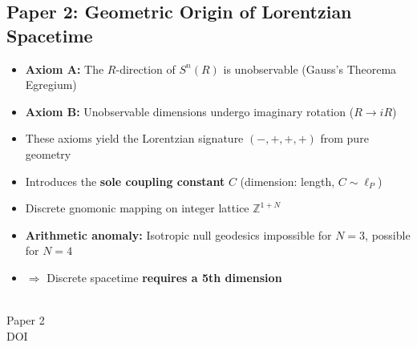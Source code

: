 \documentclass[11pt,a4paper]{article}
\begin{document}
\vspace{10pt}

\noindent\begin{minipage}[t]{0.82\textwidth}
\subsection*{Paper 2: Geometric Origin of Lorentzian Spacetime}
\vspace{-6pt}
\begin{itemize}
\item \textbf{Axiom A:} The $R$-direction of $S^n(R)$ is unobservable (Gauss's Theorema Egregium)
\item \textbf{Axiom B:} Unobservable dimensions undergo imaginary rotation ($R \to iR$)
\item These axioms yield the Lorentzian signature $(-,+,+,+)$ from pure geometry
\item Introduces the \textbf{sole coupling constant} $C$ (dimension: length, $C \sim \ell_P$)
\item Discrete gnomonic mapping on integer lattice $\mathbb{Z}^{1+N}$
\item \textbf{Arithmetic anomaly:} Isotropic null geodesics impossible for $N=3$, possible for $N=4$
\item $\Longrightarrow$ Discrete spacetime \textbf{requires a 5th dimension}
\end{itemize}
\end{minipage}%
\hfill
\begin{minipage}[t]{0.15\textwidth}
\vspace{0pt}
\centering
{}\\[3pt]
{\scriptsize Paper 2\\DOI}
\end{minipage}

\vspace{10pt}
\end{document}
